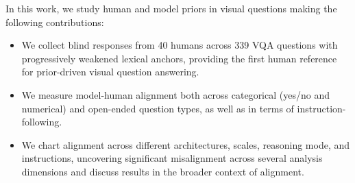\documentclass[letterpaper]{article}
\begin{document}
In this work, we study human and model priors in visual questions making the following contributions: 
\begin{itemize}
    \item We collect blind responses from 40 humans across 339 VQA questions with progressively weakened lexical anchors, providing the first human reference for prior-driven visual question answering.
    \item We measure model-human alignment both across categorical (yes/no and numerical) and open-ended question types, as well as in terms of instruction-following. 
    \item We chart alignment across different architectures, scales, reasoning mode, and instructions, uncovering significant misalignment across several analysis dimensions and discuss results in the broader context of alignment.%
\end{itemize}
\end{document}

